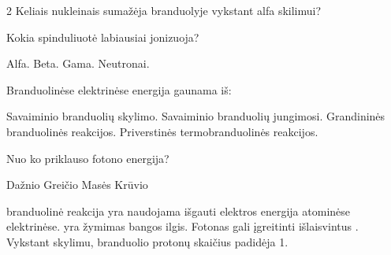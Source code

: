 \documentclass{exam}
\begin{document}
	\begin{center}
	\end{center}
	
	\vspace{5mm}

	\begin{questions}
	\raggedcolumns\begin{multicols}             {2} 
\question Keliais nukleinais sumažėja branduolyje vykstant alfa skilimui? \begin{choices}
\end{choices}
\question Kokia spinduliuotė labiausiai jonizuoja? \begin{choices}
    \choice Alfa.
    \choice Beta.
    \choice Gama.
    \choice Neutronai.
\end{choices}

\question Branduolinėse elektrinėse energija gaunama iš: \begin{choices}
    \choice Savaiminio branduolių skylimo.
    \choice Savaiminio branduolių jungimosi.
    \choice Grandininės branduolinės reakcijos.
    \choice Priverstinės termobranduolinės reakcijos.
\end{choices}
\question Nuo ko priklauso fotono energija? \begin{choices}
    \choice Dažnio
    \choice Greičio
    \choice Masės
    \choice Krūvio
\end{choices}
\end{multicols} 

	\question \fillin[grandininė] branduolinė reakcija yra naudojama išgauti elektros energija atominėse elektrinėse.
\question \fillin[L] yra žymimas bangos ilgis.
\question Fotonas gali įgreitinti išlaisvintus \fillin[elektronus].
\question Vykstant \fillin[beta] skylimu, branduolio protonų skaičius padidėja 1.


\end{questions}
\end{document}
